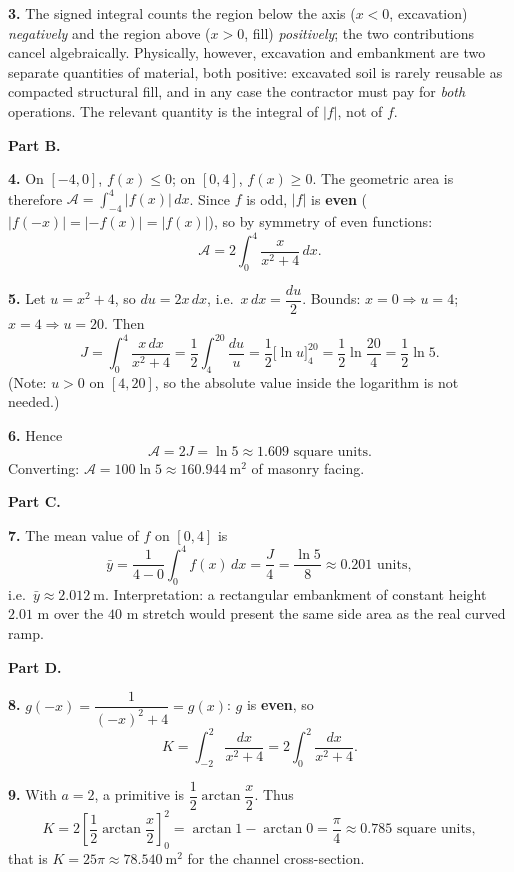 \documentclass[11pt]{article}
\begin{document}
\textbf{3.} The signed integral counts the region below the axis ($x<0$, excavation) \emph{negatively} and the region above ($x>0$, fill) \emph{positively}; the two contributions cancel algebraically. Physically, however, excavation and embankment are two separate quantities of material, both positive: excavated soil is rarely reusable as compacted structural fill, and in any case the contractor must pay for \emph{both} operations. The relevant quantity is the integral of $|f|$, not of $f$.

\textbf{Part B.}\par
\textbf{4.} On $[-4,0]$, $f(x)\le 0$; on $[0,4]$, $f(x)\ge 0$. The geometric area is therefore $\mathcal{A} = \int_{-4}^{4}|f(x)|\,dx$. Since $f$ is odd, $|f|$ is \textbf{even} ($|f(-x)| = |-f(x)| = |f(x)|$), so by symmetry of even functions:
\[
\mathcal{A} = 2\int_{0}^{4}\frac{x}{x^2+4}\,dx.
\]

\textbf{5.} Let $u = x^2+4$, so $du = 2x\,dx$, i.e.\ $x\,dx = \dfrac{du}{2}$. Bounds: $x=0 \Rightarrow u=4$; $x=4 \Rightarrow u=20$. Then
\[
J = \int_{0}^{4}\frac{x\,dx}{x^2+4} = \frac{1}{2}\int_{4}^{20}\frac{du}{u} = \frac{1}{2}\Big[\ln u\Big]_{4}^{20} = \frac{1}{2}\ln\frac{20}{4} = \frac{1}{2}\ln 5.
\]
(Note: $u>0$ on $[4,20]$, so the absolute value inside the logarithm is not needed.)

\textbf{6.} Hence
\[
\mathcal{A} = 2J = \ln 5 \approx 1.609 \text{ square units}.
\]
Converting: $\mathcal{A} = 100\ln 5 \approx 160.944\ \mathrm{m}^2$ of masonry facing.

\textbf{Part C.}\par
\textbf{7.} The mean value of $f$ on $[0,4]$ is
\[
\bar{y} = \frac{1}{4-0}\int_{0}^{4} f(x)\,dx = \frac{J}{4} = \frac{\ln 5}{8} \approx 0.201 \text{ units},
\]
i.e.\ $\bar{y} \approx 2.012\ \mathrm{m}$. Interpretation: a rectangular embankment of constant height $2.01$ m over the $40$ m stretch would present the same side area as the real curved ramp.

\textbf{Part D.}\par
\textbf{8.} $g(-x) = \dfrac{1}{(-x)^2+4} = g(x)$: $g$ is \textbf{even}, so
\[
K = \int_{-2}^{2}\frac{dx}{x^2+4} = 2\int_{0}^{2}\frac{dx}{x^2+4}.
\]

\textbf{9.} With $a=2$, a primitive is $\dfrac{1}{2}\arctan\dfrac{x}{2}$. Thus
\[
K = 2\left[\frac{1}{2}\arctan\frac{x}{2}\right]_{0}^{2} = \arctan 1 - \arctan 0 = \frac{\pi}{4} \approx 0.785 \text{ square units},
\]
that is $K = 25\pi \approx 78.540\ \mathrm{m}^2$ for the channel cross-section.
\end{document}
